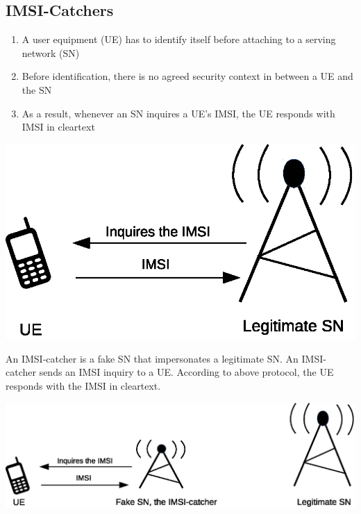 \documentclass[portrait,a0]{a0poster}
\begin{document}
\begin{multicols}{2} %


\section{IMSI-Catchers}
\begin{enumerate}
\item A user equipment (UE) has to identify itself before attaching to a serving network (SN)
\item Before identification, there is no agreed security context in between a UE and the SN
\item As a result, whenever an SN inquires a UE's IMSI, the UE responds with IMSI in cleartext
\end{enumerate}

\begin{center}
\begin{minipage}[t]{0.9\linewidth} %
\vspace{-.75cm} %
\includegraphics[width=.8\linewidth]{IMSI-catcher.eps}
\hspace{0pt}
\vspace{.15cm} %
\end{minipage} 
\end{center}

\noindent
An IMSI-catcher is a fake SN that impersonates a legitimate SN. An IMSI-catcher sends an IMSI inquiry to a UE. According to above protocol, the UE responds with the IMSI in cleartext.

\begin{center}
\begin{minipage}[t]{0.9\linewidth} %
\vspace{-1.5cm} %
\includegraphics[width=1\linewidth]{IMSI-catcher1.eps}
\hspace{0pt}
\vspace{-.75cm} %
\end{minipage} 
\end{center}



\end{multicols}
\end{document}
